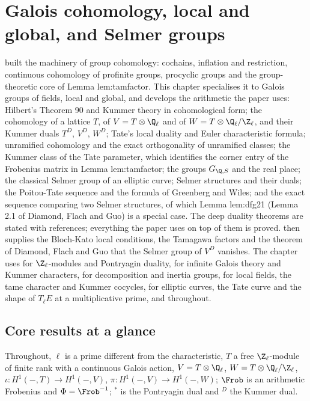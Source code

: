 \chapter{Galois cohomology, local and global, and Selmer groups}\label{ch:galcoh}

 built the machinery of group cohomology: cochains, inflation and restriction, continuous cohomology of profinite groups, procyclic groups and
the group-theoretic core of Lemma lem:tamfactor. This chapter specialises it to Galois groups of fields, local and global, and develops the arithmetic the paper uses:
Hilbert's Theorem 90 and Kummer theory in cohomological form; the cohomology of a lattice $T$, of $V=T\otimes\Q_\ell$ and of $W=T\otimes\Q_\ell/\Z_\ell$, and their Kummer duals
$T^D$, $V^D$, $W^D$; Tate's local duality and Euler characteristic formula; unramified cohomology and the exact orthogonality of unramified classes; the Kummer class of
the Tate parameter, which identifies the corner entry of the Frobenius matrix in Lemma lem:tamfactor; the groups $G_{\Q,S}$ and the real place; the classical Selmer
group of an elliptic curve; Selmer structures and their duals; the Poitou-Tate sequence and the formula of Greenberg and Wiles; and the exact sequence comparing two
Selmer structures, of which Lemma lem:dfg21 (Lemma 2.1 of Diamond, Flach and Guo) is a special case. The deep duality theorems are stated with references; everything
the paper uses on top of them is proved.  then supplies the Bloch-Kato local conditions, the Tamagawa factors and the theorem of Diamond, Flach and Guo
that the Selmer group of $V^D$ vanishes. The chapter uses  for $\Z_\ell$-modules and Pontryagin duality,  for infinite Galois theory and
Kummer characters,  for decomposition and inertia groups,  for local fields, the tame character and Kummer cocycles, 
for elliptic curves, the Tate curve and the shape of $T_\ell E$ at a multiplicative prime, and  throughout.

\section*{Core results at a glance}

Throughout, $\ell$ is a prime different from the characteristic, $T$ a free $\Z_\ell$-module of finite rank with a continuous Galois action, $V=T\otimes\Q_\ell$,
$W=T\otimes\Q_\ell/\Z_\ell$, $\iota\colon H^1(-,T)\to H^1(-,V)$, $\pi\colon H^1(-,V)\to H^1(-,W)$; $\Frob$ is an arithmetic Frobenius and $\Phi=\Frob^{-1}$; ${}^*$ is the Pontryagin dual and ${}^D$
the Kummer dual.

